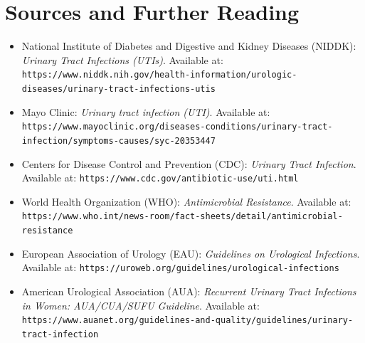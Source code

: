 \section*{Sources and Further Reading}
\begin{itemize}
    \item National Institute of Diabetes and Digestive and Kidney Diseases (NIDDK): \textit{Urinary Tract Infections (UTIs)}. Available at: \texttt{https://www.niddk.nih.gov/health-information/urologic-diseases/urinary-tract-infections-utis}
    \item Mayo Clinic: \textit{Urinary tract infection (UTI)}. Available at: \texttt{https://www.mayoclinic.org/diseases-conditions/urinary-tract-infection/symptoms-causes/syc-20353447}
    \item Centers for Disease Control and Prevention (CDC): \textit{Urinary Tract Infection}. Available at: \texttt{https://www.cdc.gov/antibiotic-use/uti.html}
    \item World Health Organization (WHO): \textit{Antimicrobial Resistance}. Available at: \texttt{https://www.who.int/news-room/fact-sheets/detail/antimicrobial-resistance}
    \item European Association of Urology (EAU): \textit{Guidelines on Urological Infections}. Available at: \texttt{https://uroweb.org/guidelines/urological-infections}
    \item American Urological Association (AUA): \textit{Recurrent Urinary Tract Infections in Women: AUA/CUA/SUFU Guideline}. Available at: \texttt{https://www.auanet.org/guidelines-and-quality/guidelines/urinary-tract-infection}
\end{itemize}